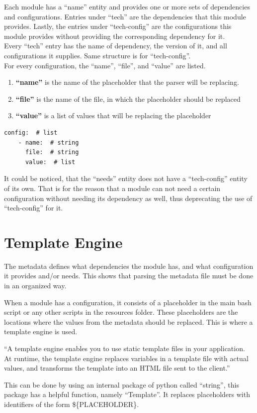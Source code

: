 Each module has a “name” entity and provides one or more sets of dependencies and configurations. Entries under “tech” are the dependencies that this module provides. Lastly, the entries under “tech-config” are the configurations this module provides without providing the corresponding dependency for it.\\
Every “tech” entry has the name of dependency, the version of it, and all configurations it supplies. Same structure is for “tech-config”.\\
For every configuration, the “name”, “file”, and “value” are listed.
\begin{enumerate}
  \item \textbf{“name”} is the name of the placeholder that the parser will be replacing.
  \item \textbf{“file”} is the name of the file, in which the placeholder should be replaced
  \item \textbf{“value”} is a list of values that will be replacing the placeholder
\end{enumerate}

\begin{lstlisting}[caption=YAML Schema, style=pythonstyle]
config:  # list
    - name:  # string
      file:  # string
      value:  # list
\end{lstlisting}
It could be noticed, that the “needs” entity does not have a “tech-config” entity of its own. That is for the reason that a module can not need a certain configuration without needing its dependency as well, thus deprecating the use of “tech-config” for it.


\section{Template Engine} \label{temp_engine}
The metadata defines what dependencies the module has, and what configuration it provides and/or needs. This shows that parsing the metadata file must be done in an organized way.

When a module has a configuration, it consists of a placeholder in the main bash script or any other scripts in the resources folder. These placeholders are the locations where the values from the metadata should be replaced. This is where a template engine is used.

“A template engine enables you to use static template files in your application. At runtime, the template engine replaces variables in a template file with actual values, and transforms the template into an HTML file sent to the client.”\cite{template}

This can be done by using an internal package of python called “string”, this package has a helpful function, namely “Template”\cite{string}. It replaces placeholders with identifiers of the form \$\{PLACEHOLDER\}.
